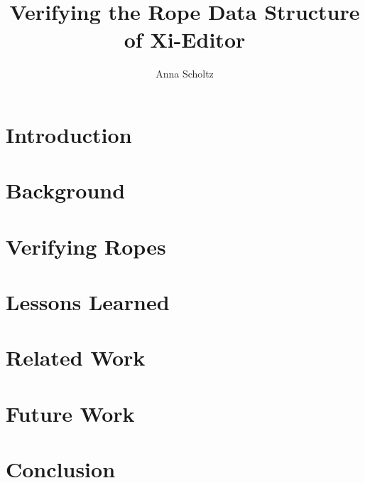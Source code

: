 \documentclass[sigconf]{acmart}
\begin{document}
\title{Verifying the Rope Data Structure of Xi-Editor}


\author{Anna Scholtz}



\begin{abstract}

\end{abstract}





\maketitle

\section{Introduction}
\label{sec:introduction}


\section{Background}
\label{sec:background}


\section{Verifying Ropes}
\label{sec:verification}


\section{Lessons Learned}
\label{sec:lessons-learned}


\section{Related Work}
\label{sec:related-work}


\section{Future Work}
\label{sec:future-work}



\section{Conclusion}
\label{sec:conclusion}




\end{document}
